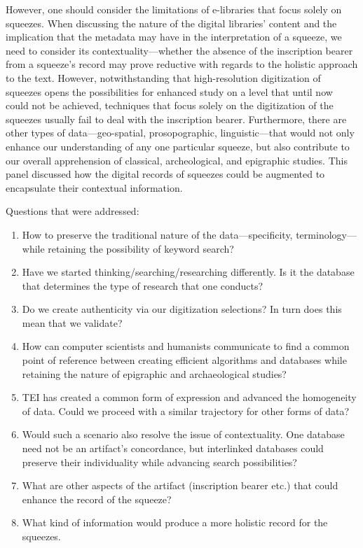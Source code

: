 \documentclass[amsthm,ebook]{saparticle}
\begin{document}
However, one should consider the limitations of e-libraries that focus solely on squeezes. When discussing the nature of the digital libraries’ content and the implication that the metadata may have in the interpretation of a squeeze, we need to consider its contextuality—whether the absence of the inscription bearer from a squeeze’s record may prove reductive with regards to the holistic approach to the text. However, notwithstanding that high-resolution digitization of squeezes opens the possibilities for enhanced study on a level that until now could not be achieved, techniques that focus solely on the digitization of the squeezes usually fail to deal with the inscription bearer. Furthermore, there are other types of data—geo-spatial, prosopographic, linguistic—that would not only enhance our understanding of any one particular squeeze, but also contribute to our overall apprehension of classical, archeological, and epigraphic studies. This panel discussed how the digital records of squeezes could be augmented to encapsulate their contextual information. 

Questions that were addressed:

\begin{enumerate}
\item How to preserve the traditional nature of the data—specificity, terminology—while retaining the possibility of keyword search?

\item Have we started thinking/searching/researching differently. Is it the database that determines the type of research that one conducts?

\item Do we create authenticity via our digitization selections? In turn does this mean that we validate?

\item How can computer scientists and humanists communicate to find a common point of reference between creating efficient algorithms and databases while retaining the nature of epigraphic and archaeological studies?

\item TEI has created a common form of expression and advanced the homogeneity of data. Could we proceed with a similar trajectory for other forms of data? 

\item Would such a scenario also resolve the issue of contextuality. One database need not be an artifact’s concordance, but interlinked databases could preserve their individuality while advancing search possibilities?

\item What are other aspects of the artifact (inscription bearer etc.) that could enhance the record of the squeeze?
 
\item What kind of information would produce a more holistic record for the squeezes.
\end{enumerate}
\end{document}
